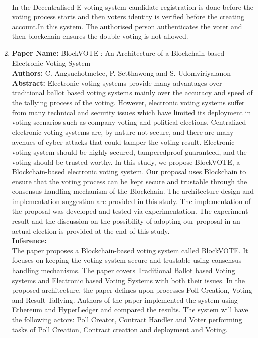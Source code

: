 \documentclass[oneside, 12pt]{book}
\begin{document}
\begin{enumerate}
					\\In the Decentralised E-voting system candidate registration is done before the voting process starts and then voters identity is verified before the creating account.In this system. The authorised person authenticates the voter and then blockchain ensures the double voting is not allowed.
				\item
					\textbf{Paper Name:} BlockVOTE : An Architecture of a Blockchain-based Electronic Voting System \cite{angsuchotmetee2019blockvote}\\
					\textbf{Authors:} C. Angsuchotmetee, P. Setthawong and S. Udomviriyalanon\\
					\textbf{Abstract:} Electronic voting systems provide many advantages over traditional ballot based voting systems mainly over the accuracy and speed of the tallying process of the voting. However, electronic voting systems suffer from many technical and security issues which have limited its deployment in voting scenarios such as company voting and political elections. Centralized electronic voting systems are, by nature not secure, and there are many avenues of cyber-attacks that could tamper the voting result. Electronic voting system should be highly secured, tamperedproof guaranteed, and the voting should be trusted worthy. In this study, we propose BlockVOTE, a Blockchain-based electronic voting system. Our proposal uses Blockchain to ensure that the voting process can be kept secure and trustable through the consensus handling mechanism of the Blockchain. The architecture design and implementation suggestion are provided in this study. The implementation of the proposal was developed and tested via experimentation. The experiment result and the discussion on the possibility of adopting our proposal in an actual election is provided at the end of this study.\\
					\textbf{Inference:}
					\\The paper proposes a Blockchain-based voting system called BlockVOTE. It focuses on keeping the voting system secure and trustable using consensus handling mechanisms. The paper covers Traditional Ballot based Voting systems and Electronic based Voting Systems with both their issues. In the proposed architecture, the paper defines upon processes Poll Creation, Voting and Result Tallying. Authors of the paper implemented the system using Ethereum and HyperLedger and compared the results. The system will have the following actors: Poll Creator, Contract Handler and Voter performing tasks of Poll Creation, Contract creation and deployment and Voting.

\end{enumerate}
\end{document}
